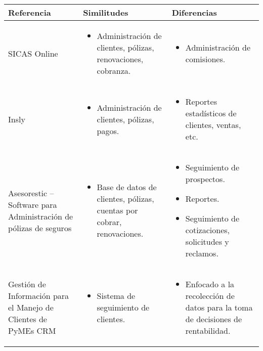 \begin{table}[h!] %
  \begin{tabular}{p{} p{} p{}}
    \toprule
    \textbf{{Referencia}} & \textbf{{Similitudes}} & \textbf{{Diferencias}} \\
    \toprule
    SICAS Online &
    \begin{itemize}[leftmargin=*]
        \item Administración de clientes, pólizas, renovaciones, cobranza.
    \end{itemize} &
    \begin{itemize}[leftmargin=*]
        \item Administración de comisiones.
    \end{itemize} \\
    \midrule
    
    Insly &
    \begin{itemize}[leftmargin=*]
        \item Administración de clientes, pólizas, pagos.
    \end{itemize} &
    \begin{itemize}[leftmargin=*]
        \item Reportes estadísticos de clientes, ventas, etc.
    \end{itemize} \\

\midrule
Asesorestic – Software para Administración de pólizas de seguros &
\begin{itemize}[leftmargin=*]
	\item Base de datos de clientes, pólizas, cuentas por cobrar, renovaciones.
\end{itemize} &
\begin{itemize}[leftmargin=*]
	\item Seguimiento de prospectos.
	\item Reportes.
	\item Seguimiento de cotizaciones, solicitudes y reclamos.
\end{itemize} \\

\midrule
Gestión de Información para el Manejo de Clientes de PyMEs CRM &
\begin{itemize}[leftmargin=*]
	\item Sistema de seguimiento de clientes.
\end{itemize} &
\begin{itemize}[leftmargin=*]
	\item Enfocado a la recolección de datos para la toma de decisiones de rentabilidad.
\end{itemize} \\


\end{tabular}
\end{table}
